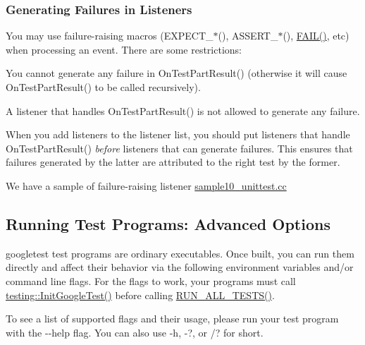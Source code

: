 \subsubsection*{Generating Failures in Listeners}

You may use failure-\/raising macros ({\ttfamily E\+X\+P\+E\+C\+T\+\_\+$\ast$()}, {\ttfamily A\+S\+S\+E\+R\+T\+\_\+$\ast$()}, {\ttfamily \mbox{\hyperlink{gtest_8h_a3e26a8d27caa386ed0ea7ce9d5b7c4ed}{F\+A\+I\+L()}}}, etc) when processing an event. There are some restrictions\+:


\begin{DoxyEnumerate}
\item You cannot generate any failure in {\ttfamily On\+Test\+Part\+Result()} (otherwise it will cause {\ttfamily On\+Test\+Part\+Result()} to be called recursively).
\end{DoxyEnumerate}
\begin{DoxyEnumerate}
\item A listener that handles {\ttfamily On\+Test\+Part\+Result()} is not allowed to generate any failure.
\end{DoxyEnumerate}

When you add listeners to the listener list, you should put listeners that handle {\ttfamily On\+Test\+Part\+Result()} {\itshape before} listeners that can generate failures. This ensures that failures generated by the latter are attributed to the right test by the former.

We have a sample of failure-\/raising listener \mbox{\hyperlink{sample10__unittest_8cc}{sample10\+\_\+unittest.\+cc}}

\subsection*{Running Test Programs\+: Advanced Options}

googletest test programs are ordinary executables. Once built, you can run them directly and affect their behavior via the following environment variables and/or command line flags. For the flags to work, your programs must call {\ttfamily \mbox{\hyperlink{namespacetesting_afd726ae08c9bd16dc52f78c822d9946b}{testing\+::\+Init\+Google\+Test()}}} before calling {\ttfamily \mbox{\hyperlink{gtest_8h_a853a3792807489591d3d4a2f2ff9359f}{R\+U\+N\+\_\+\+A\+L\+L\+\_\+\+T\+E\+S\+T\+S()}}}.

To see a list of supported flags and their usage, please run your test program with the {\ttfamily -\/-\/help} flag. You can also use {\ttfamily -\/h}, {\ttfamily -\/?}, or {\ttfamily /?} for short.


